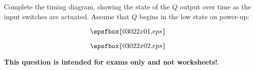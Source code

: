 

Complete the timing diagram, showing the state of the $Q$ output over time as the input switches are actuated.  Assume that $Q$ begins in the low state on power-up:

$$\epsfbox{03022x01.eps}$$







$$\epsfbox{03022x02.eps}$$







{\bf This question is intended for exams only and not worksheets!}.




